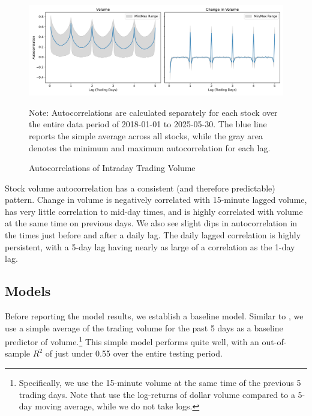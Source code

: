 \documentclass[12pt]{article}
\begin{document}
\begin{figure}[H]
    \centering
    \caption{Autocorrelations of Intraday Trading Volume}
    \includegraphics[width=\linewidth]{../Output/Volume Autocorrelations.pdf}
    \begin{minipage}{0.95\linewidth}
        \footnotesize
        \singlespacing
        Note: Autocorrelations are calculated separately for each stock over the entire data period of 2018-01-01 to 2025-05-30. The blue line reports the simple average across all stocks, while the gray area denotes the minimum and maximum autocorrelation for each lag.
    \end{minipage}
    \label{fig:autocorrelations}
\end{figure}

Stock volume autocorrelation has a consistent (and therefore predictable) pattern. Change in volume is negatively correlated with 15-minute lagged volume, has very little correlation to mid-day times, and is highly correlated with volume at the same time on previous days. We also see slight dips in autocorrelation in the times just before and after a daily lag. The daily lagged correlation is highly persistent, with a 5-day lag having nearly as large of a correlation as the 1-day lag. 

\subsection{Models}
Before reporting the model results, we establish a baseline model. Similar to \textcite{goyenko2024trading}, we use a simple average of the trading volume for the past 5 days as a baseline predictor of volume.\footnote{Specifically, we use the 15-minute volume at the same time of the previous 5 trading days. Note that \textcite{goyenko2024trading} use the log-returns of dollar volume compared to a 5-day moving average, while we do not take logs.} This simple model performs quite well, with an out-of-sample $R^2$ of just under 0.55 over the entire testing period.
\end{document}

